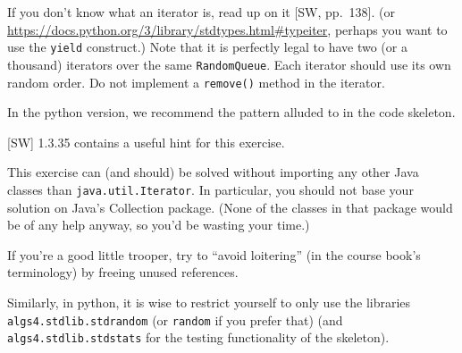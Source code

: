 \documentclass{tufte-handout}
\begin{document}
If you don't know what an iterator is, read up on it [SW, pp.~138].
(or \url{https://docs.python.org/3/library/stdtypes.html#typeiter}, perhaps you want to use the {\tt yield} construct.)
Note that it is perfectly legal to have two (or a thousand) iterators over the same {\tt RandomQueue}.
Each iterator should use its own random order.
Do not implement a {\tt remove()} method in the iterator.

In the python version, we recommend the pattern alluded to in the code skeleton.

[SW] 1.3.35 contains a useful hint for this exercise.

This exercise can (and should) be solved without importing any other
Java classes than {\tt java.util.Iterator}.
In particular, you should not base your solution on Java's Collection
package.
(None of the classes in that package would be of any help anyway, so
you'd be wasting your time.)

If you're a good little trooper, try to ``avoid loitering'' (in the course book's terminology) by freeing
unused references. 

Similarly, in python, it is wise to restrict yourself to only use the libraries {\tt algs4.stdlib.stdrandom} (or {\tt random} if you prefer that) (and {\tt algs4.stdlib.stdstats} for the testing functionality of the skeleton). 
 
\newpage 
\end{document}

